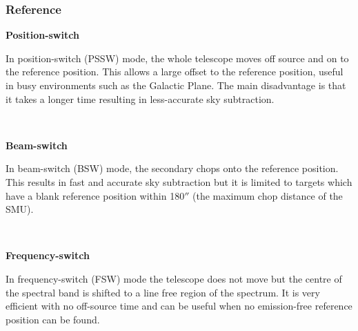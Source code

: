 \documentclass[twoside,11pt]{article}
\renewcommand{\_}{\texttt{\symbol{95}}}
\begin{document}
\subsubsection{Reference}
\begin{minipage}[t]{0.14\linewidth}
\textbf{Position-switch}
\end{minipage}
\begin{minipage}[t]{0.85\linewidth}
In position-switch (PSSW) mode, the whole telescope moves off source and on to the reference position. This allows a large offset to the reference position, useful in busy environments such as the Galactic Plane. The main disadvantage is that it takes a longer time resulting in less-accurate sky subtraction. 
\end{minipage}
\vspace{0.7cm}\\
\begin{minipage}[t]{0.14\linewidth}
\textbf{Beam-switch}
\end{minipage}
\begin{minipage}[t]{0.85\linewidth}
In beam-switch (BSW) mode, the secondary chops onto the reference position. This results in fast and accurate sky subtraction but it is limited to targets which have a blank reference position within 180$''$ (the maximum chop distance of the SMU).
\end{minipage}
\vspace{0.7cm}\\
\begin{minipage}[t]{0.14\linewidth}
\textbf{Frequency-switch}
\end{minipage}
\begin{minipage}[t]{0.85\linewidth}
In frequency-switch (FSW) mode the telescope does not move but the centre of the spectral band is shifted to a line free region of the spectrum. It is very efficient with no off-source time and can be useful  when no emission-free reference position can be found. 
\end{minipage}
\end{document}
